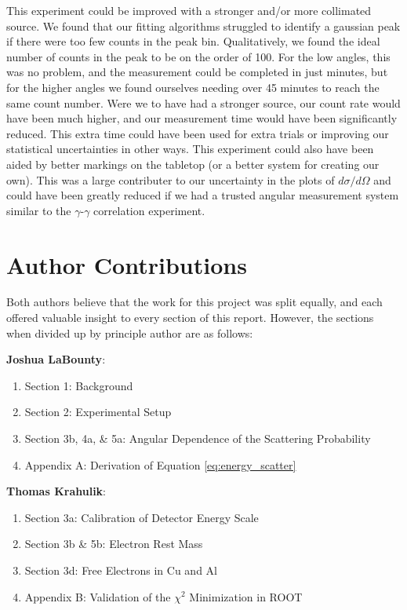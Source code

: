 \documentclass[%
 reprint,
 amsmath,amssymb,
 aps,
 pra,
]{revtex4-1}
\begin{document}
This experiment could be improved with a stronger and/or more collimated source. We found that our fitting algorithms struggled to identify a gaussian peak if there were too few counts in the peak bin. Qualitatively, we found the ideal number of counts in the peak to be on the order of 100. For the low angles, this was no problem, and the measurement could be completed in just minutes, but for the higher angles we found ourselves needing over 45 minutes to reach the same count number. Were we to have had a stronger source, our count rate would have been much higher, and our measurement time would have been significantly reduced. This extra time could have been used for extra trials or improving our statistical uncertainties in other ways. This experiment could also have been aided by better markings on the tabletop (or a better system for creating our own). This was a large contributer to our uncertainty in the plots of $d\sigma / d\Omega$ and could have been greatly reduced if we had a trusted angular measurement system similar to the $\gamma$-$\gamma$ correlation experiment.

\section{Author Contributions}

Both authors believe that the work for this project was split equally, and each offered valuable insight to every section of this report. However, the sections when divided up by principle author are as follows:

\noindent \textbf{Joshua LaBounty}:
\begin{enumerate}
	\item Section 1: Background 
	\item Section 2: Experimental Setup
	\item Section 3b, 4a, \& 5a: Angular Dependence of the Scattering Probability
	\item Appendix A: Derivation of Equation \ref{eq:energy_scatter}
\end{enumerate}

\noindent \textbf{Thomas Krahulik}:
\begin{enumerate}
	\item Section 3a: Calibration of Detector Energy Scale
	\item Section 3b \& 5b: Electron Rest Mass
	\item Section 3d: Free Electrons in Cu and Al
	\item Appendix B: Validation of the $\chi^2$ Minimization in ROOT
\end{enumerate}
\end{document}
